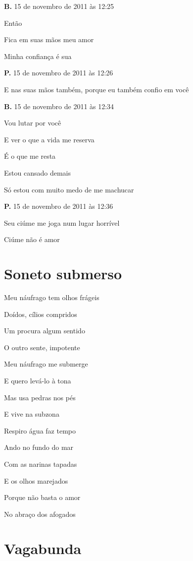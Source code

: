 {\textbf{B.} 15 de novembro de 2011 às 12:25

Então

Fica em suas mãos meu amor

Minha confiança é sua

\textbf{P.} 15 de novembro de 2011 às 12:26

E nas suas mãos também, porque eu também confio em você

\textbf{B.} 15 de novembro de 2011 às 12:34

Vou lutar por você

E ver o que a vida me reserva

É o que me resta

Estou cansado demais

Só estou com muito medo de me machucar

\textbf{P.} 15 de novembro de 2011 às 12:36

Seu ciúme me joga num lugar horrível

Ciúme não é amor
}

\chapter{Soneto submerso}


{\parindent0pt
Meu náufrago tem olhos frágeis

Doídos, cílios compridos

Um procura algum sentido

O outro sente, impotente\medskip

Meu náufrago me submerge

E quero levá-lo à tona

Mas usa pedras nos pés

E vive na subzona\medskip

Respiro água faz tempo

Ando no fundo do mar

Com as narinas tapadas\medskip

E os olhos marejados

Porque não basta o amor

No abraço dos afogados
}

\chapter{Vagabunda}

